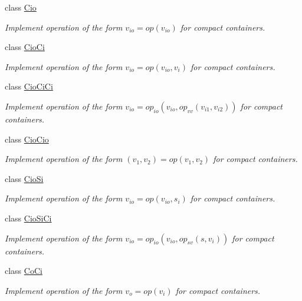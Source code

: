 \begin{DoxyCompactItemize}
\item 
class \hyperlink{classvct_dynamic_compact_loop_engines_1_1_cio}{Cio}
\begin{DoxyCompactList}\small\item\em Implement operation of the form $v_{io} = op(v_{io})$ for compact containers. \end{DoxyCompactList}\item 
class \hyperlink{classvct_dynamic_compact_loop_engines_1_1_cio_ci}{Cio\-Ci}
\begin{DoxyCompactList}\small\item\em Implement operation of the form $v_{io} = op(v_{io}, v_i)$ for compact containers. \end{DoxyCompactList}\item 
class \hyperlink{classvct_dynamic_compact_loop_engines_1_1_cio_ci_ci}{Cio\-Ci\-Ci}
\begin{DoxyCompactList}\small\item\em Implement operation of the form $v_{io} = op_{io}(v_{io}, op_{vv}(v_{i1}, v_{i2}))$ for compact containers. \end{DoxyCompactList}\item 
class \hyperlink{classvct_dynamic_compact_loop_engines_1_1_cio_cio}{Cio\-Cio}
\begin{DoxyCompactList}\small\item\em Implement operation of the form $(v_{1}, v_{2}) = op(v_{1}, v_{2})$ for compact containers. \end{DoxyCompactList}\item 
class \hyperlink{classvct_dynamic_compact_loop_engines_1_1_cio_si}{Cio\-Si}
\begin{DoxyCompactList}\small\item\em Implement operation of the form $ v_{io} = op(v_{io}, s_i)$ for compact containers. \end{DoxyCompactList}\item 
class \hyperlink{classvct_dynamic_compact_loop_engines_1_1_cio_si_ci}{Cio\-Si\-Ci}
\begin{DoxyCompactList}\small\item\em Implement operation of the form $v_{io} = op_{io}(v_{io}, op_{sv}(s, v_i))$ for compact containers. \end{DoxyCompactList}\item 
class \hyperlink{classvct_dynamic_compact_loop_engines_1_1_co_ci}{Co\-Ci}
\begin{DoxyCompactList}\small\item\em Implement operation of the form $v_o = op(v_i)$ for compact containers. \end{DoxyCompactList}\item 

\end{DoxyCompactItemize}
